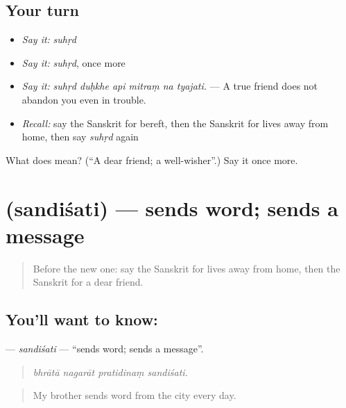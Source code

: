 \subsection*{Your turn}
\begin{itemize}
\raggedright
  \item \emph{Say it:} \emph{suhṛd}
  \item \emph{Say it:} \emph{suhṛd}, once more
  \item \emph{Say it:} \emph{suhṛd duḥkhe api mitraṃ na tyajati.} — A true friend does not abandon you even in trouble.
  \item \emph{Recall:} say the Sanskrit for bereft, then the Sanskrit for lives away from home, then say \emph{suhṛd} again
\end{itemize}

\begin{tcolorbox}[breakable,colback=teal!4,colframe=teal!35!black,title={Before you move on}]
What does  mean? (\textquotedblleft{}A dear friend; a well-wisher\textquotedblright{}.) Say it once more.
\end{tcolorbox}
\section[\texorpdfstring{\sk{सन्दिशति} (sandiśati)}{सन्दिशति (sandiśati)}]{ (sandiśati) — sends word; sends a message}

\label{lesson:SA-C453-sandisati}



\begin{quote}
Before the new one: say the Sanskrit for lives away from home, then the Sanskrit for a dear friend.
\end{quote}

\subsection*{You'll want to know: }
\textbf{} — \emph{sandiśati} — \textquotedblleft{}sends word; sends a message\textquotedblright{}.

\begin{quote}
   
\end{quote}

\begin{quote}
\emph{bhrātā nagarāt pratidinaṃ sandiśati.}
\end{quote}

\begin{quote}
My brother sends word from the city every day.
\end{quote}

